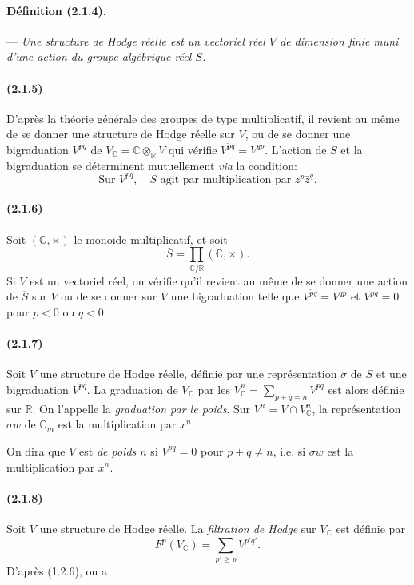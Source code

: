 \documentclass[10pt]{article}
\newcommand{\C}{\mathbb C}
\newcommand{\R}{\mathbb R}
\newcommand{\Gm}{\mathbb G_m}
\begin{document}
\paragraph{Définition (2.1.4).} --- \emph{Une structure de Hodge réelle est un vectoriel réel $V$ de dimension finie muni d'une action du groupe algébrique réel $S$.}

\paragraph{(2.1.5)} D'après la théorie générale des groupes de type multiplicatif, il revient au même de se donner une structure de Hodge réelle sur $V$, ou de se donner une bigraduation $V^{pq}$ de $V_\C=\C\otimes_\R V$ qui vérifie $\overline{V^{pq}}=V^{qp}$. L'action de $S$ et la bigraduation se déterminent mutuellement \emph{via} la condition:
\[
\tag{2.1.5.1}
\text{Sur }V^{pq},\quad S\text{ agit par multiplication par }z^p\bar z^q.
\]

\paragraph{(2.1.6)} Soit $(\C,\times)$ le monoïde multiplicatif, et soit
\[
\overline S=\prod_{\C/\R}(\C,\times).
\]
Si $V$ est un vectoriel réel, on vérifie qu'il revient au même de se donner une action de $\overline S$ sur $V$ ou de se donner sur $V$ une bigraduation telle que $\overline{V^{pq}}=V^{qp}$ et $V^{pq}=0$ pour $p<0$ ou $q<0$.

\paragraph{(2.1.7)} Soit $V$ une structure de Hodge réelle, définie par une représentation $\sigma$ de $S$ et une bigraduation $V^{pq}$. La graduation de $V_\C$ par les $V_\C^n=\sum_{p+q=n}V^{pq}$ est alors définie sur $\R$. On l'appelle la \emph{graduation par le poids}. Sur $V^n=V\cap V_\C^n$, la représentation $\sigma w$ de $\Gm$ est la multiplication par $x^n$.

On dira que $V$ est \emph{de poids $n$} si $V^{pq}=0$ pour $p+q\ne n$, i.e. si $\sigma w$ est la multiplication par $x^n$.

\paragraph{(2.1.8)} Soit $V$ une structure de Hodge réelle. La \emph{filtration de Hodge} sur $V_\C$ est définie par
\[
F^p(V_\C)=\sum_{p'\ge p}V^{p'q'}.
\]
D'après (1.2.6), on a
\end{document}
